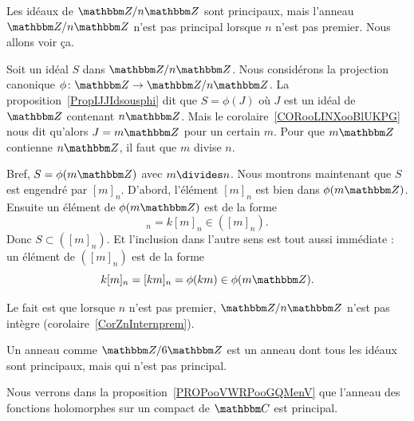 \begin{example}       \label{EXooCJRPooYkWdyr}

    Les idéaux de \( \eZ/n\eZ\) sont principaux, mais l'anneau \( \eZ/n\eZ\) n'est pas principal lorsque \( n\) n'est pas premier. Nous allons voir ça.

    \begin{subproof}
        \item[Les idéaux de \( \eZ/n\eZ\) sont principaux]

            Soit un idéal \( S\) dans \( \eZ/n\eZ\). Nous considérons la projection canonique \( \phi\colon \eZ\to \eZ/n\eZ\). La proposition~\ref{PropIJJIdsousphi} dit que  \( S=\phi(J)\) où \( J\) est un idéal de \( \eZ\) contenant \( n\eZ\). Mais le corolaire~\ref{CORooLINXooBlUKPG} nous dit qu'alors \( J=m\eZ\) pour un certain \( m\). Pour que \( m\eZ\) contienne \( n\eZ\), il faut que \( m\) divise \( n\).

            Bref, \( S=\phi(m\eZ)\) avec \( m\divides n\). Nous montrons maintenant que \( S\) est engendré par \( [m]_n\). D'abord, l'élément \( [m]_n\) est bien dans \( \phi(m\eZ)\). Ensuite un élément de \( \phi(m\eZ)\) est de la forme
            \begin{equation}
                [km]_n=k[m]_n\in ([m]_n).
            \end{equation}
            Donc \( S\subset ([m]_n)\). Et l'inclusion dans l'autre sens est tout aussi immédiate : un élément de \( ([m]_n)\) est de la forme
            \begin{equation}
                k[m]_n=[km]_n=\phi(km)\in \phi(m\eZ).
            \end{equation}

        \item[Si \( n\) n'est pas premier, \( \eZ/n\eZ\) n'est pas principal]

            Le fait est que lorsque \( n\) n'est pas premier, \( \eZ/n\eZ\) n'est pas intègre (corolaire~\ref{CorZnInternprem}).

        \item[Moralité]

            Un anneau comme \( \eZ/6\eZ\) est un anneau dont tous les idéaux sont principaux, mais qui n'est pas principal.

    \end{subproof}
\end{example}

\begin{example}
    Nous verrons dans la proposition~\ref{PROPooVWRPooGQMenV} que l'anneau des fonctions holomorphes sur un compact de \( \eC\) est principal.
\end{example}

